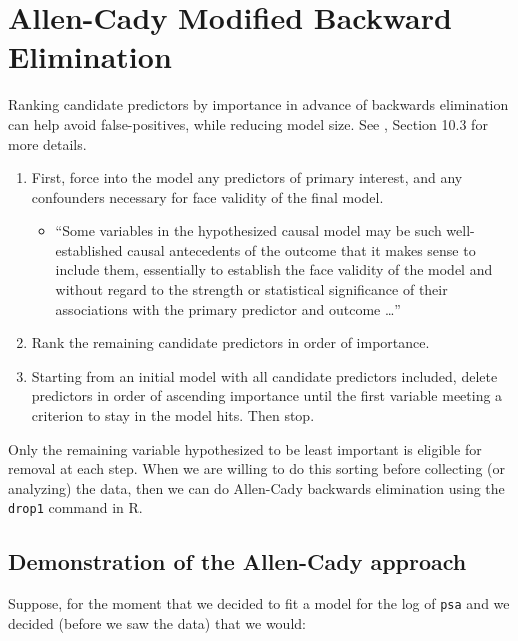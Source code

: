 \documentclass[]{book}
\providecommand{\tightlist}{%
  \setlength{\itemsep}{0pt}\setlength{\parskip}{0pt}}
\theoremstyle{definition}
\theoremstyle{definition}
\theoremstyle{definition}
\theoremstyle{remark}
\begin{document}
\section{Allen-Cady Modified Backward
Elimination}\label{allen-cady-modified-backward-elimination}

Ranking candidate predictors by importance in advance of backwards
elimination can help avoid false-positives, while reducing model size.
See \citet{Vittinghoff2012}, Section 10.3 for more details.

\begin{enumerate}
\def\labelenumi{\arabic{enumi}.}
\tightlist
\item
  First, force into the model any predictors of primary interest, and
  any confounders necessary for face validity of the final model.

  \begin{itemize}
  \tightlist
  \item
    ``Some variables in the hypothesized causal model may be such
    well-established causal antecedents of the outcome that it makes
    sense to include them, essentially to establish the face validity of
    the model and without regard to the strength or statistical
    significance of their associations with the primary predictor and
    outcome \ldots{}''
  \end{itemize}
\item
  Rank the remaining candidate predictors in order of importance.
\item
  Starting from an initial model with all candidate predictors included,
  delete predictors in order of ascending importance until the first
  variable meeting a criterion to stay in the model hits. Then stop.
\end{enumerate}

Only the remaining variable hypothesized to be least important is
eligible for removal at each step. When we are willing to do this
sorting before collecting (or analyzing) the data, then we can do
Allen-Cady backwards elimination using the \texttt{drop1} command in R.

\subsection{Demonstration of the Allen-Cady
approach}\label{demonstration-of-the-allen-cady-approach}

Suppose, for the moment that we decided to fit a model for the log of
\texttt{psa} and we decided (before we saw the data) that we would:
\end{document}
